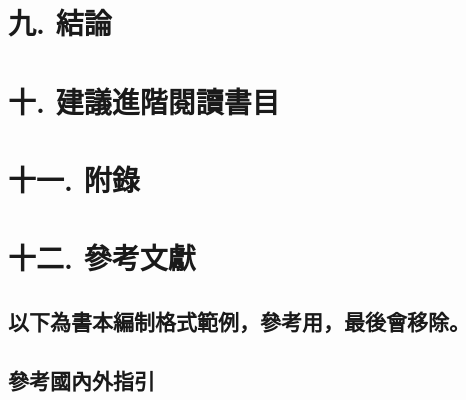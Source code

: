 \documentclass[
  letterpaper,
  DIV=11,
  numbers=noendperiod]{scrreprt}
\begin{document}
\section*{九. 結論}\label{ux4e5d.-ux7d50ux8ad6}


\section*{十.
建議進階閱讀書目}\label{ux5341.-ux5efaux8b70ux9032ux968eux95b1ux8b80ux66f8ux76ee}


\section*{十一. 附錄}\label{ux5341ux4e00.-ux9644ux9304}


\section*{十二. 參考文獻}\label{ux5341ux4e8c.-ux53c3ux8003ux6587ux737b}


\subsection*{以下為書本編制格式範例，參考用，最後會移除。}\label{ux4ee5ux4e0bux70baux66f8ux672cux7de8ux5236ux683cux5f0fux7bc4ux4f8bux53c3ux8003ux7528ux6700ux5f8cux6703ux79fbux9664}

\subsection*{參考國內外指引}\label{ux53c3ux8003ux570bux5167ux5916ux6307ux5f15}
\end{document}
